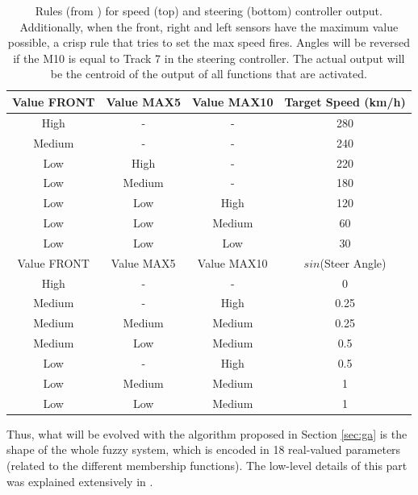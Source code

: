\documentclass[10pt,journal,compsoc]{IEEEtran}
\begin{document}
\begin{table}[h!tb]
  \centering
  {\scriptsize
    \caption{Rules  (from \cite{salem_evo18}) for speed (top) and steering
      (bottom) controller output. Additionally, when 
      the front, right and left sensors have the maximum value
      possible, a crisp rule that tries to set the max speed
      fires.  Angles will be reversed
      if the M10 is equal to Track 7 in the steering controller. The
      actual output will be the centroid of the output of all functions
      that are activated. \label{tab:output}}
    \begin{tabular}{|c|c|c||c|}
\hline
      Value FRONT & Value MAX5 & Value MAX10 & Target Speed (km/h) \\
      \hline
      High & - & - & 280 \\
      Medium & - & - & 240 \\
      Low & High & - & 220 \\
      Low & Medium & - & 180 \\
      Low & Low & High & 120 \\
      Low & Low & Medium & 60 \\           
      Low & Low & Low & 30 \\     
\hline
\hline
      Value FRONT & Value MAX5 & Value MAX10 & $sin$(Steer Angle) \\
\hline
      High & - & - & 0 \\
      Medium & - & High & 0.25 \\
      Medium & Medium & Medium & 0.25 \\
      Medium & Low & Medium & 0.5 \\
      Low & - & High & 0.5 \\
      Low & Medium & Medium & 1 \\
      Low & Low & Medium & 1 \\ 
      
\hline
\end{tabular}
}
\end{table}



Thus, what will be evolved with the algorithm proposed in Section
\ref{sec:ga} is the shape of the whole fuzzy system, which is encoded
in 18 real-valued parameters (related to the different membership
functions). The low-level details of this part was explained
extensively in \cite{DBLP:conf/cig/SalemMG19}. 
\end{document}
